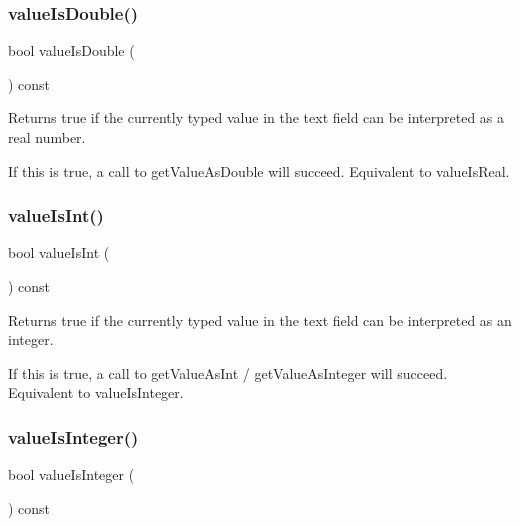 \subsubsection{\texorpdfstring{value\+Is\+Double()}{valueIsDouble()}}
{\footnotesize\ttfamily bool value\+Is\+Double (\begin{DoxyParamCaption}{ }\end{DoxyParamCaption}) const\hspace{0.3cm}{\ttfamily [virtual]}}



Returns true if the currently typed value in the text field can be interpreted as a real number. 

If this is true, a call to get\+Value\+As\+Double will succeed. Equivalent to value\+Is\+Real. \mbox{\label{classsgl_1_1GTextField_a4bccf08b3b712af3839106a1cbdc5d02}} 
\subsubsection{\texorpdfstring{value\+Is\+Int()}{valueIsInt()}}
{\footnotesize\ttfamily bool value\+Is\+Int (\begin{DoxyParamCaption}{ }\end{DoxyParamCaption}) const\hspace{0.3cm}{\ttfamily [virtual]}}



Returns true if the currently typed value in the text field can be interpreted as an integer. 

If this is true, a call to get\+Value\+As\+Int / get\+Value\+As\+Integer will succeed. Equivalent to value\+Is\+Integer. \mbox{\label{classsgl_1_1GTextField_af5aaf003739648d9aee89a17e715a57e}} 
\subsubsection{\texorpdfstring{value\+Is\+Integer()}{valueIsInteger()}}
{\footnotesize\ttfamily bool value\+Is\+Integer (\begin{DoxyParamCaption}{ }\end{DoxyParamCaption}) const\hspace{0.3cm}{\ttfamily [virtual]}}



